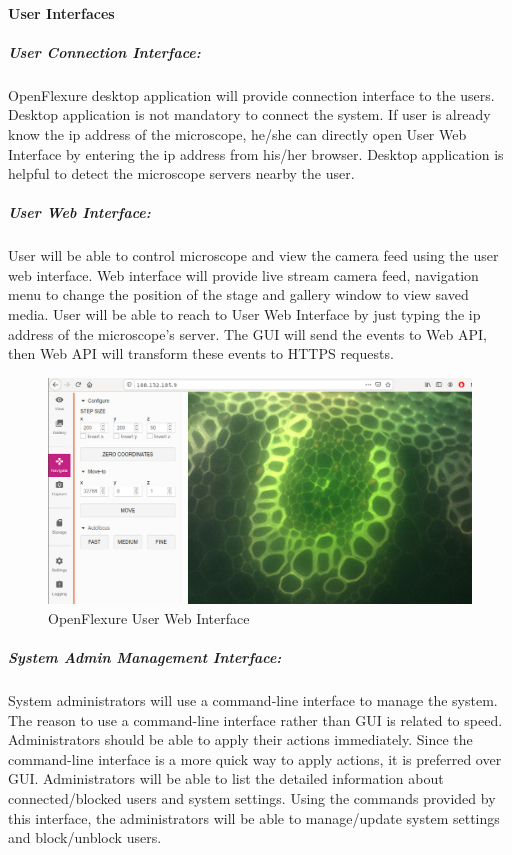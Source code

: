 \paragraph{User Interfaces}
\subparagraph{User Connection Interface:} OpenFlexure desktop application will provide connection interface to the users. Desktop application is not mandatory to connect the system. If user is already know the ip address of the microscope, he/she can directly open User Web Interface by entering the ip address from his/her browser. Desktop application is helpful to detect the microscope servers nearby the user.
\subparagraph{User Web Interface:} User will be able to control microscope and view the camera feed using the user web interface. Web interface will provide live stream camera feed, navigation menu to change the position of the stage and gallery window to view saved media. User will be able to reach to User Web Interface by just typing the ip address of the microscope's server. The GUI will send the events to Web API, then Web API will transform these events to HTTPS requests. 
\begin{figure}[H]
	\centering
	\includegraphics[scale=0.3]{Figures/user_web_interface}
	\caption{OpenFlexure User Web Interface}
	\label{fig:user_web_interface}
\end{figure}
\subparagraph{System Admin Management Interface:} System administrators will use a command-line interface to manage the system. The reason to use a command-line interface rather than GUI is related to speed. Administrators should be able to apply their actions immediately. Since the command-line interface is a more quick way to apply actions, it is preferred over GUI. Administrators will be able to list the detailed information about connected/blocked users and system settings. Using the commands provided by this interface, the administrators will be able to manage/update system settings and block/unblock users.

